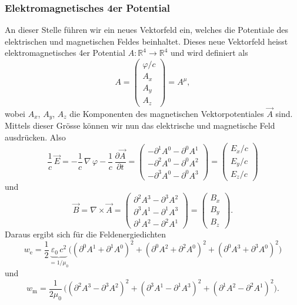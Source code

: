 \subsubsection{Elektromagnetisches 4er Potential}
An dieser Stelle führen wir ein neues Vektorfeld ein, welches die Potentiale des elektrischen und magnetischen Feldes beinhaltet.
Dieses neue Vektorfeld heisst elektromagnetisches 4er Potential
\(
A:\mathbb{R}^4 \rightarrow \mathbb{R}^4
\)
und wird definiert als
\begin{equation}
	A
	=
	\begin{pmatrix}
		\varphi / c\\
		A_x\\
		A_y\\
		A_z
	\end{pmatrix}
	=
	A^{\mu},
\end{equation}
wobei $A_x$, $A_y$, $A_z$ die Komponenten des magnetischen Vektorpotentiales $\vec{A}$ sind.
Mittels dieser Grösse können wir nun das elektrische und magnetische Feld ausdrücken.
Also
\begin{equation}
\frac{1}{c}\, \vec{E}
=
-\frac{1}{c}\, \nabla\,\varphi - \frac{1}{c}\,\frac{\partial \vec{A}}{\partial t}
=
\begin{pmatrix}
	-\partial^1 A^0 - \partial^0 A^1\\
	-\partial^2 A^0 - \partial^0 A^2\\
	-\partial^3 A^0 - \partial^0 A^3
\end{pmatrix}
=
\begin{pmatrix}
	E_x / c\\
	E_y / c\\
	E_z / c
\end{pmatrix}
\end{equation}
und
\begin{equation}
\vec{B}
=
\nabla \times \vec{A}
=
\begin{pmatrix}
	\partial^2 A^3 - \partial^3 A^2\\
	\partial^3 A^1 - \partial^1 A^3\\
	\partial^1 A^2 - \partial^2 A^1
\end{pmatrix}
=
\begin{pmatrix}
	B_x\\
	B_y\\
	B_z
\end{pmatrix}.
\end{equation}
Daraus ergibt sich für die Feldenergiedichten
\[
w_{\text{e}}
=
\frac{1}{2}\underbrace{\varepsilon_0\,c^2}_{\displaystyle=1/\mu_0} \biggl(\left(\partial^0 A^1 + \partial^1 A^0\right)^2 + \left(\partial^0 A^2 + \partial^2 A^0\right)^2 + 
\left(\partial^0 A^3 + \partial^3 A^0\right)^2\biggr)
\]
und 
\[
w_{\text{m}}
=
\frac{1}{2\mu_0}\,\biggl(\left(\partial^2 A^3 - \partial^3 A^2\right)^2 + \left(\partial^3 A^1 - \partial^1 A^3\right)^2 + 
\left(\partial^1 A^2 - \partial^2 A^1\right)^2\biggr).
\]

